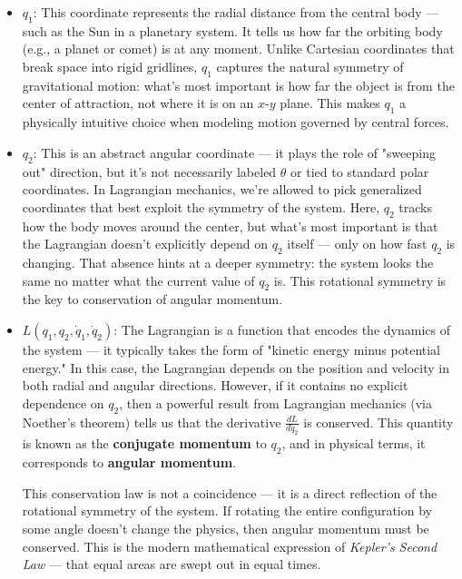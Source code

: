 \begin{itemize}
    \item \boldmath\( q_1 \): \unboldmath This coordinate represents the radial distance from the central body — such as the Sun in a planetary system. It tells us how far the orbiting body (e.g., a planet or comet) is at any moment. Unlike Cartesian coordinates that break space into rigid gridlines, \( q_1 \) captures the natural symmetry of gravitational motion: what's most important is how far the object is from the center of attraction, not where it is on an \( x \)-\( y \) plane. This makes \( q_1 \) a physically intuitive choice when modeling motion governed by central forces.

    \item \boldmath\( q_2 \): \unboldmath This is an abstract angular coordinate — it plays the role of "sweeping out" direction, but it’s not necessarily labeled \( \theta \) or tied to standard polar coordinates. In Lagrangian mechanics, we’re allowed to pick generalized coordinates that best exploit the symmetry of the system. Here, \( q_2 \) tracks how the body moves around the center, but what’s most important is that the Lagrangian doesn’t explicitly depend on \( q_2 \) itself — only on how fast \( q_2 \) is changing. That absence hints at a deeper symmetry: the system looks the same no matter what the current value of \( q_2 \) is. This rotational symmetry is the key to conservation of angular momentum.

    \item \boldmath\( L(q_1, q_2, \dot{q}_1, \dot{q}_2) \): \unboldmath The Lagrangian is a function that encodes the dynamics of the system — it typically takes the form of "kinetic energy minus potential energy." In this case, the Lagrangian depends on the position and velocity in both radial and angular directions. However, if it contains no explicit dependence on \( q_2 \), then a powerful result from Lagrangian mechanics (via Noether’s theorem) tells us that the derivative \( \frac{dL}{d\dot{q}_2} \) is conserved. This quantity is known as the \textbf{conjugate momentum} to \( q_2 \), and in physical terms, it corresponds to \textbf{angular momentum}.

    This conservation law is not a coincidence — it is a direct reflection of the rotational symmetry of the system. If rotating the entire configuration by some angle doesn’t change the physics, then angular momentum must be conserved. This is the modern mathematical expression of \textit{Kepler’s Second Law} — that equal areas are swept out in equal times.
\end{itemize}


